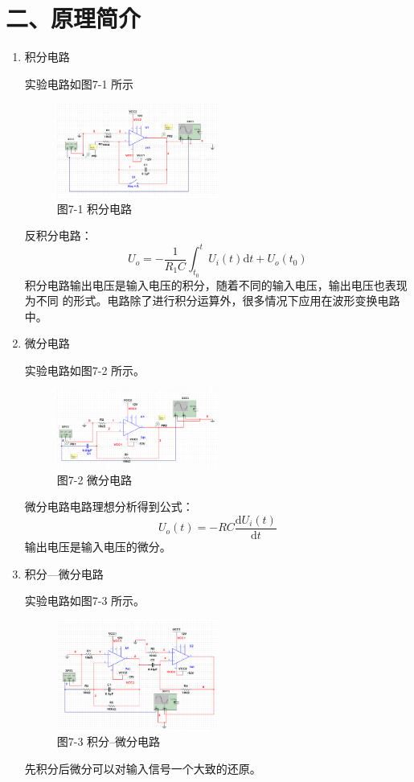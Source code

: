 \documentclass[a4paper,10pt,notitlepage]{article}
\begin{document}
	\section*{二、原理简介}
	\begin{enumerate}
		\item 积分电路\par 
		实验电路如图7-1 所示
		\begin{figure}[h]
			\centering
			\includegraphics[width=0.5\textwidth]{1.png}
			\caption*{图7-1 积分电路}
		\end{figure}
		反积分电路：
		$$U_o=-\frac{1}{R_1C}\int_{t_0}^{t}U_i(t)\mathrm{d}t+U_o(t_0)$$
		积分电路输出电压是输入电压的积分，随着不同的输入电压，输出电压也表现为不同
		的形式。电路除了进行积分运算外，很多情况下应用在波形变换电路中。
		\item 微分电路\par 
		实验电路如图7-2 所示。
		\begin{figure}[h]
			\centering
			\includegraphics[width=0.5\textwidth]{2.png}
			\caption*{图7-2 微分电路}
		\end{figure}
		微分电路电路理想分析得到公式：
		$$U_o(t)=-RC\frac{\mathrm{d}U_i(t)}{\mathrm{d}t}$$
		输出电压是输入电压的微分。
		\item 积分—微分电路\par 
		实验电路如图7-3 所示。
		\begin{figure}[h]
			\centering
			\includegraphics[width=0.5\textwidth]{3.png}
			\caption*{图7-3 积分--微分电路}
		\end{figure}
		先积分后微分可以对输入信号一个大致的还原。
	\end{enumerate}
\end{document}
